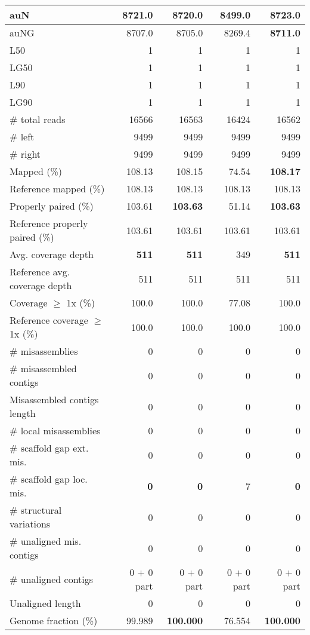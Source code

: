 \documentclass[12pt,a4paper]{article}
\begin{document}
\begin{table}[ht]
\begin{center}
\begin{tabular}{|l*{4}{|r}|}
auN & 8721.0 & 8720.0 & 8499.0 & {\bf 8723.0} \\ \hline
auNG & 8707.0 & 8705.0 & 8269.4 & {\bf 8711.0} \\ \hline
L50 & 1 & 1 & 1 & 1 \\ \hline
LG50 & 1 & 1 & 1 & 1 \\ \hline
L90 & 1 & 1 & 1 & 1 \\ \hline
LG90 & 1 & 1 & 1 & 1 \\ \hline
\# total reads & 16566 & 16563 & 16424 & 16562 \\ \hline
\# left & 9499 & 9499 & 9499 & 9499 \\ \hline
\# right & 9499 & 9499 & 9499 & 9499 \\ \hline
Mapped (\%) & 108.13 & 108.15 & 74.54 & {\bf 108.17} \\ \hline
Reference mapped (\%) & 108.13 & 108.13 & 108.13 & 108.13 \\ \hline
Properly paired (\%) & 103.61 & {\bf 103.63} & 51.14 & {\bf 103.63} \\ \hline
Reference properly paired (\%) & 103.61 & 103.61 & 103.61 & 103.61 \\ \hline
Avg. coverage depth & {\bf 511} & {\bf 511} & 349 & {\bf 511} \\ \hline
Reference avg. coverage depth & 511 & 511 & 511 & 511 \\ \hline
Coverage $\geq$ 1x (\%) & 100.0 & 100.0 & 77.08 & 100.0 \\ \hline
Reference coverage $\geq$ 1x (\%) & 100.0 & 100.0 & 100.0 & 100.0 \\ \hline
\# misassemblies & 0 & 0 & 0 & 0 \\ \hline
\# misassembled contigs & 0 & 0 & 0 & 0 \\ \hline
Misassembled contigs length & 0 & 0 & 0 & 0 \\ \hline
\# local misassemblies & 0 & 0 & 0 & 0 \\ \hline
\# scaffold gap ext. mis. & 0 & 0 & 0 & 0 \\ \hline
\# scaffold gap loc. mis. & {\bf 0} & {\bf 0} & 7 & {\bf 0} \\ \hline
\# structural variations & 0 & 0 & 0 & 0 \\ \hline
\# unaligned mis. contigs & 0 & 0 & 0 & 0 \\ \hline
\# unaligned contigs & 0 + 0 part & 0 + 0 part & 0 + 0 part & 0 + 0 part \\ \hline
Unaligned length & 0 & 0 & 0 & 0 \\ \hline
Genome fraction (\%) & 99.989 & {\bf 100.000} & 76.554 & {\bf 100.000} \\ \hline

\end{tabular}
\end{center}
\end{table}
\end{document}
